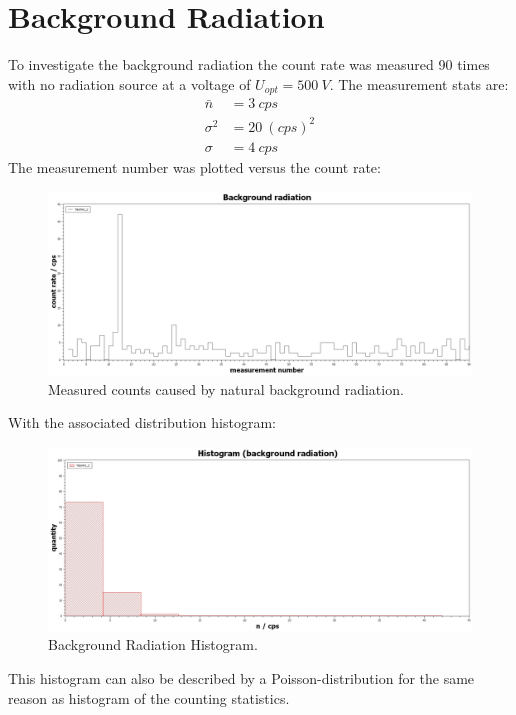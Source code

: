 \section{Background Radiation}\label{sec:backgroundRadiation}
%
To investigate the background radiation the count rate was measured 90 times with no radiation source at a voltage of
\( U_{opt}=\SI{500}{V} \). The measurement stats are:
%
\begin{align}
\bar{n}     &=  \SI{3}{cps} \\
\sigma^{2}  &=  \SI{20}{(cps)^{2}} \\
\sigma      &=  \SI{4}{cps}
\end{align}
The measurement number was plotted versus the count rate:
\begin{figure}[H]
 \centering
 \includegraphics[width=.9\textwidth]{scidavis/Fig.10_Background radiation.jpg}
 \caption[Background radiation cps]{Measured counts caused by natural background radiation.}
 \label{fig:backgroundRad}
\end{figure}
With the associated distribution histogram:
\begin{figure}[H]
 \centering
 \includegraphics[width=.9\textwidth]{scidavis/Fig.11_Histogram (background radiation).jpg}
 \caption[Back Rad Hist]{Background Radiation Histogram.}
 \label{fig:backgroundRadHistogram}
\end{figure}
This histogram can also be described by a Poisson-distribution for the same reason as histogram of the counting
statistics.
%
